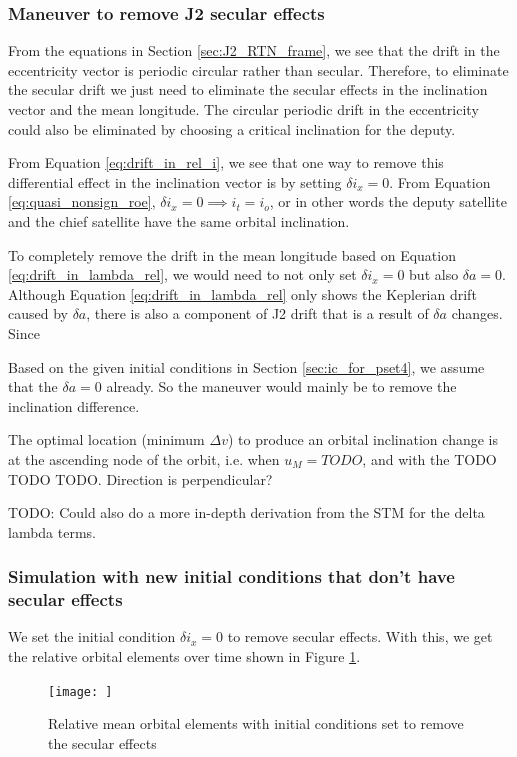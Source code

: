 \subsubsection{Maneuver to remove J2 secular effects}\label{sec:J2_maneuver}
From the equations in Section \ref{sec:J2_RTN_frame}, we see that the drift in the eccentricity vector is periodic circular rather than secular. Therefore, to eliminate the secular drift we just need to eliminate the secular effects in the inclination vector and the mean longitude. The circular periodic drift in the eccentricity could also be eliminated by choosing a critical inclination for the deputy. 

From Equation \ref{eq:drift_in_rel_i}, we see that one way to remove this differential effect in the inclination vector is by setting $\delta i_x = 0$. From Equation \ref{eq:quasi_nonsign_roe}, $\delta i_x = 0 \implies i_t = i_o$, or in other words the deputy satellite and the chief satellite have the same orbital inclination. 

To completely remove the drift in the mean longitude based on Equation \ref{eq:drift_in_lambda_rel}, we would need to not only set $\delta i_x = 0$ but also  $\delta a = 0$. Although Equation \ref{eq:drift_in_lambda_rel} only shows the Keplerian drift caused by $\delta a$, there is also a component of J2 drift that is a result of $\delta a$ changes. Since 

Based on the given initial conditions in Section \ref{sec:ic_for_pset4}, we assume that the $\delta a = 0$ already. So the maneuver would mainly be to remove the inclination difference. 

The optimal location (minimum $\Delta v$) to produce an orbital inclination change is at the ascending node of the orbit, i.e. when $u_M = TODO$, and with the TODO TODO TODO. Direction is perpendicular?

TODO: Could also do a more in-depth derivation from the STM for the delta lambda terms.

\subsubsection{Simulation with new initial conditions that don't have secular effects}

We set the initial condition $\delta i_x = 0$ to remove secular effects. With this, we get the relative orbital elements over time shown in Figure \ref{fig:rel_roe_no_drift}.

\begin{figure}[htpb]
    \centering
    \texttt{[image: ]}
    \caption{Relative mean orbital elements with initial conditions set to remove the secular effects}
    \label{fig:rel_roe_no_drift}
\end{figure}

